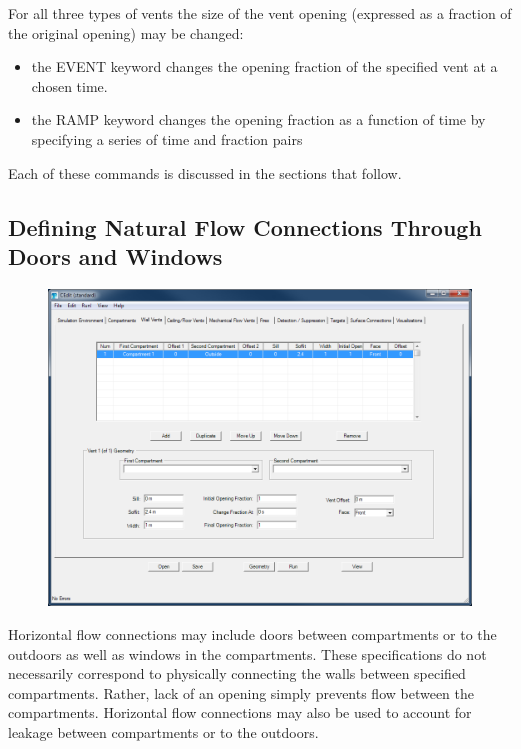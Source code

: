 For all three types of vents the size of the vent opening (expressed as a fraction of the original opening) may be changed:

\begin{itemize}
\item the EVENT keyword changes the opening fraction of the specified vent at a chosen time.
\item the RAMP keyword changes the opening fraction as a function of time by specifying a series of time and fraction pairs
\end{itemize}

Each of these commands is discussed in the sections that follow.

\subsection{Defining Natural Flow Connections Through Doors and Windows}

\begin{figure}[h!]
\includegraphics[width=6.5in]{FIGURES/Input_File/Natural_Flow_Tab}
\end{figure}

Horizontal flow connections may include doors between compartments or to the outdoors as well as windows in the compartments.  These specifications do not necessarily correspond to physically connecting the walls between specified compartments.  Rather, lack of an opening simply prevents flow between the compartments.  Horizontal flow connections may also be used to account for leakage between compartments or to the outdoors.

